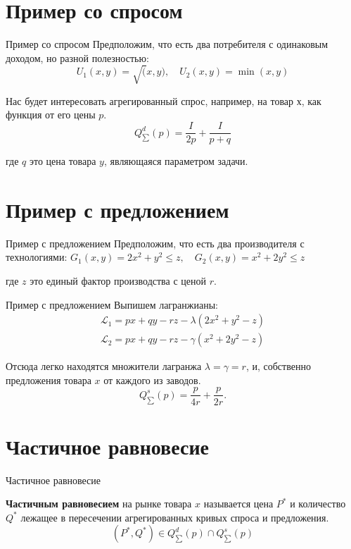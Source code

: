 \documentclass{beamer}
\begin{document}
\section{Пример со спросом}
\begin{frame}{Пример со спросом}
Предположим, что есть два потребителя с одинаковым доходом, но разной полезностью:
$$ U_1(x,y) = \sqrt(x,y), \quad U_2(x,y) = \min(x,y)$$

Нас будет интересовать агрегированный спрос, например, на товар $х$, как функция от его цены $p$.
$$ Q^d_{\sum}(p) = \frac{I}{2p} + \frac{I}{p + q} $$

где $q$ это цена товара $y$, являющаяся параметром задачи.
	
\end{frame}

\section{Пример с предложением}

\begin{frame}{Пример с предложением}
Предположим, что есть два производителя с технологиями:
$G_1(x,y) = 2 x^2 + y^2 \leqslant z, \quad G_2(x,y) = x^2 + 2 y^2 \leqslant z$

где $z$ это единый фактор производства с ценой $r$.

\end{frame}

\begin{frame}{Пример с предложением}
Выпишем лагранжианы:
\begin{gather*}
\mathcal{L}_1 = px + qy - rz - \lambda(2x^2 + y^2 - z)\\
\mathcal{L}_2 = px + qy - rz - \gamma(x^2 + 2y^2 - z)
\end{gather*}

Отсюда легко находятся множители лагранжа $\lambda = \gamma = r$, и, собственно предложения товара $x$ от каждого из заводов.
$$Q^s_{\sum}(p) = \frac{p}{4 r} + \frac{p}{2r}.$$
\end{frame}

\section{Частичное равновесие}
\begin{frame}{Частичное равновесие}

\begin{definition}
\textbf{Частичным равновесием} на рынке товара $x$ называется цена $P^{\ast}$ и количество $Q^{\ast}$ лежащее в пересечении агрегированных кривых спроса и предложения.
$$(P^{\ast},Q^{\ast}) \in Q^d_{\sum}(p) \cap Q^s_{\sum}(p)$$
\end{definition}
	
\end{frame}
\end{document}
